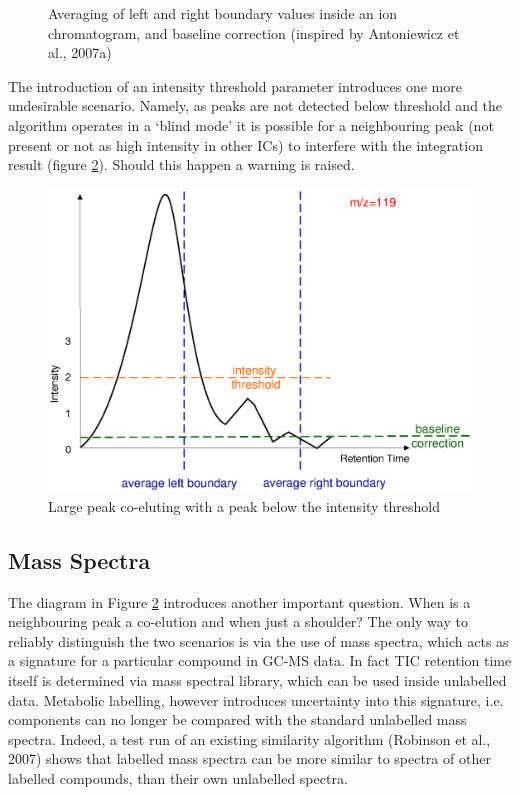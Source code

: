 \begin{figure}
\begin{center}
  \end{center}
  \caption{Averaging of left and right boundary values inside an ion chromatogram,
and baseline correction (inspired by Antoniewicz et al., 2007a)}
  \label{fig:88}
\end{figure}

The introduction of an intensity threshold parameter introduces one more 
undesirable scenario. Namely, as peaks are not detected below threshold and
the algorithm operates in a ‘blind mode’ it is possible for a neighbouring
peak (not present or not as high intensity in other ICs) to interfere with
the integration result (figure \ref{fig:89}). Should this happen a warning
is raised.

\begin{figure}
  \begin{center}
    \includegraphics[scale=0.5]{graphics/chapter08/89.eps}
  \end{center}
  \caption{Large peak co-eluting with a peak below the intensity threshold}
  \label{fig:89}
\end{figure}

\subsection{Mass Spectra}

The diagram in Figure \ref{fig:89} introduces another important question. 
When is a neighbouring peak a co-elution and when just a shoulder? The only way 
to reliably distinguish the two scenarios is via the use of mass spectra, which 
acts as a signature for a particular compound in GC-MS data. In fact TIC 
retention time itself is determined via mass spectral library, which can be 
used inside unlabelled data. Metabolic labelling, however introduces uncertainty 
into this signature, i.e. components can no longer be compared with the standard 
unlabelled mass spectra. Indeed, a test run of an existing similarity algorithm 
(Robinson et al., 2007) shows that labelled mass spectra can be more similar 
to spectra of other labelled compounds, than their own unlabelled spectra.

